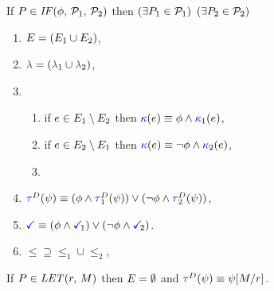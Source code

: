 \begin{figure}
  \noindent
  If $\aPS \in \sIF{\aForm}\sTHEN\aPSS_1\sELSE\aPSS_2\sFI$ then
  $(\exists P_1\in\mathcal{P}_1)$ $(\exists P_2\in\mathcal{P}_2)$
  \begin{multicols}{2}
    \begin{enumerate}[topsep=0pt,label=(\textsc{i}\arabic*),ref=\textsc{i}\arabic*]
    \item \label{if-E}
      $E = (E_1\cup E_2)$,
    \item \label{if-lambda}
      ${\labeling}=\PBR{{\labeling_1}\cup {\labeling_2}}$, 
    \item[] 
      \begin{enumerate}[leftmargin=0pt]
      \item \label{if-kappa1}
        if $e\in E_1\setminus E_2$ then ${\color{blue}\kappa}(e) \mathrel{\equiv} \phi\land{\color{blue}\kappa}_1(e)$,
      \item \label{if-kappa2}
        if $e\in E_2\setminus E_1$ then ${\color{blue}\kappa}(e) \mathrel{\equiv} \neg\phi\land{\color{blue}\kappa}_2(e)$, 
      \item \label{if-kappa12}
      \end{enumerate}
      \columnbreak
    \item \label{if-tau}
      $\aTr{\bEvs}{\bForm} \riff (\aForm\land\aTr[1]{\bEvs}{\bForm})\lor(\neg\aForm\land\aTr[2]{\bEvs}{\bForm})$,
    \item \label{if-term}
      $\aTerm \riff (\aForm\land\aTerm[1])\lor(\neg\aForm\land\aTerm[2])$.
    \item \label{if-le}
      ${\le}\supseteq{\le_1}\cup{\le_2}$,
    \end{enumerate}
  \end{multicols}
  \medskip

  \noindent
  If $\aPS\in\sLET{\aReg}{\aExp}$ then $E = \emptyset$ and
  $\aTr{\bEvs}{\bForm} \riff \bForm[\aExp/\aReg]$.
  \medskip


\end{figure}
